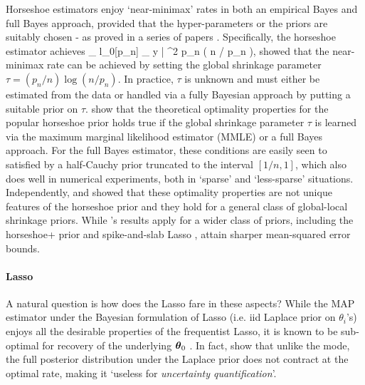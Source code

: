 \documentclass[11pt]{article}
\begin{document}
Horseshoe estimators enjoy `near-minimax' rates in both an empirical Bayes and full Bayes approach, provided that the hyper-parameters or the priors are suitably chosen - as proved in a series of papers \citep{van2014horseshoe,van2015conditions,van2016many,van2017adaptive}. Specifically, the horseshoe estimator achieves
\beq
\sup_{ \theta \in l_0[p_n] } \; _{ y | \theta } ^2 \asymp p_n \log \left ( n / p_n \right ), \label{eq:minimax}
\eeq
\citet{van2014horseshoe} showed that the near-minimax rate can be achieved by setting the global shrinkage parameter $\tau = (p_n/n) \log(n/p_n)$. In practice, $\tau$ is unknown and must either be estimated from the data or handled via a fully Bayesian approach by putting a suitable prior on $\tau$.  \cite{van2017adaptive} show that the theoretical optimality properties for the popular horseshoe prior holds true if the global shrinkage parameter $\tau$ is learned via the maximum marginal likelihood estimator (MMLE) or a full Bayes approach. For the full Bayes estimator, these conditions are easily seen to satisfied by a half-Cauchy prior truncated to the interval $[1/n,1]$, which also does well in numerical experiments, both in `sparse' and `less-sparse' situations. Independently, \citet{van2015conditions} and \citet{ghosh2016asymptotic} showed that these optimality properties are not unique features of the horseshoe prior and they hold for a general class of global-local shrinkage priors. While \cite{van2015conditions}'s results apply for a wider class of priors, including the horseshoe+ prior \citep{bhadra2015horseshoe+} and spike-and-slab Lasso \citep{rovckova2016spike}, \citet{ghosh2016asymptotic} attain sharper mean-squared error bounds. 

\paragraph{Lasso}

A natural question is how does the Lasso fare in these aspects? While the MAP estimator under the Bayesian formulation of Lasso (i.e. iid Laplace prior on $\theta_i$'s) enjoys all the desirable properties of the frequentist Lasso, it is known to be sub-optimal for recovery of the underlying $\boldsymbol{\theta}_0$ \citep{castillo2012needles}. In fact, \cite{castillo2012needles} show that unlike the mode, the full posterior distribution under the Laplace prior does not contract at the optimal rate, making it `useless for \textit{uncertainty quantification}'. 
\end{document}
